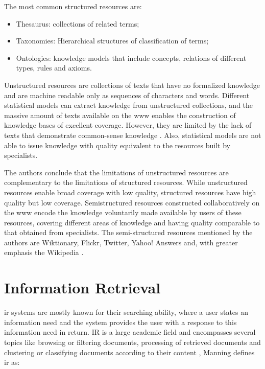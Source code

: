 The most common structured resources are:

\begin{itemize}


\item Thesaurus: collections of related terms;
\item Taxonomies: Hierarchical structures of classification of terms;
\item Ontologies: knowledge models that include concepts, relations of different types, rules and axioms.
\end{itemize}

Unstructured resources are collections of texts that have no formalized knowledge and are machine readable only as sequences of characters and words. Different statistical models can extract knowledge from unstructured collections, and the massive amount of texts available on the \gls{www} enables the construction of knowledge bases of excellent coverage. However, they are limited by the lack of texts that demonstrate common-sense knowledge \cite{hovy2013collaboratively}. Also, statistical models are not able to issue knowledge with quality equivalent to the resources built by specialists.

The authors conclude that the limitations of unstructured resources are complementary to the limitations of structured resources. While unstructured resources enable broad coverage with low quality, structured resources have high quality but low coverage. Semistructured resources constructed collaboratively on the \gls{www} encode the knowledge voluntarily made available by users of these resources, covering different areas of knowledge and having quality comparable to that obtained from specialists. The semi-structured resources mentioned by the authors are Wiktionary, Flickr, Twitter, Yahoo! Answers and, with greater emphasis the Wikipedia \cite{hovy2013collaboratively}.




\section{\hspace{3pt}Information Retrieval}

\gls{ir} systems are mostly known for their searching ability, where a user states an information need and the system provides the user with a response to this information need in return. IR is a large academic field and encompasses several topics like browsing or filtering documents, processing of retrieved documents and clustering or classifying documents according to their content \cite{Manning:2008}, Manning defines \gls{ir} as:

